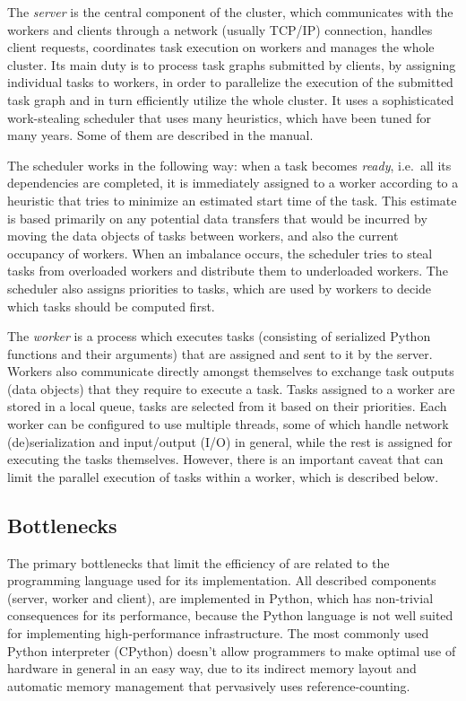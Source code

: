 The \emph{server} is the central component of the cluster, which communicates with
the workers and clients through a network (usually TCP/IP) connection, handles client requests,
coordinates task execution on workers and manages the whole \dask{} cluster.
Its main duty is to process task graphs submitted by clients, by assigning individual tasks to
workers, in order to parallelize the execution of the submitted task graph and in turn efficiently
utilize the whole cluster. It uses a sophisticated work-stealing scheduler that uses many
heuristics, which have been tuned for many years. Some of them are described in the
\dask{} manual.

The scheduler works in the following way: when a task becomes \emph{ready}, i.e.\
all its dependencies are completed, it is immediately assigned to a worker according to a heuristic
that tries to minimize an estimated start time of the task. This estimate is based primarily on any
potential data transfers that would be incurred by moving the data objects of tasks between
workers, and also the current occupancy of workers. When an imbalance occurs, the scheduler tries
to steal tasks from overloaded workers and distribute them to underloaded workers. The scheduler
also assigns priorities to tasks, which are used by workers to decide which tasks should be
computed first.

The \emph{worker} is a process which executes tasks (consisting of serialized Python
functions and their arguments) that are assigned and sent to it by the server. Workers also
communicate directly amongst themselves to exchange task outputs (data objects) that they require
to execute a task. Tasks assigned to a worker are stored in a local queue, tasks are selected from
it based on their priorities. Each worker can be configured to use multiple threads, some of which
handle network (de)serialization and input/output (I/O) in general, while the rest is assigned for
executing the tasks themselves. However, there is an important caveat that can limit the parallel
execution of tasks within a worker, which is described below.

\subsection*{Bottlenecks}
The primary bottlenecks that limit the efficiency of \dask{} are related to the
programming language used for its implementation. All described components (server, worker and
client), are implemented in Python, which has non-trivial consequences for its performance, because
the Python language is not well suited for implementing high-performance infrastructure. The most
commonly used Python interpreter (CPython\footnoteurl{https://github.com/python/cpython}) doesn't allow programmers to
make optimal use of hardware in general in an easy way, due to its indirect memory layout and
automatic memory management that pervasively uses reference-counting.

